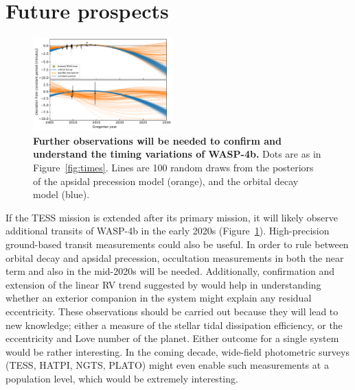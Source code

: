\documentclass[12pt,twocolumn,tighten]{aastex62}
\begin{document}
\section{Future prospects}
\label{sec:future}

\begin{figure}[!t]
	\begin{center}
		\leavevmode
		\includegraphics[width=0.48\textwidth]{f5.pdf}
	\end{center}
  \vspace{-0.5cm}
	\caption{
		{\bf Further observations will be needed to
	    confirm and understand the timing variations of WASP-4b.}
		Dots are as in Figure~\ref{fig:times}.
		Lines are 100 random draws from the posteriors of the apsidal
		precession model (orange), and the orbital decay model (blue).    
		\label{fig:future}
	}
\end{figure}

If the TESS mission is extended after its primary mission, it will
likely observe additional transits of WASP-4b in the early 2020s
(Figure~\ref{fig:future}).  High-precision ground-based transit
measurements could also be useful.  In order to rule between orbital
decay and apsidal precession, occultation measurements in both the
near term and also in the mid-2020s will be needed.  Additionally,
confirmation and extension of the linear RV trend suggested by
\citet{knutson_friends_2014} would help in understanding whether an
exterior companion in the system might explain any residual
eccentricity.  These observations should be carried out because they
will lead to new knowledge; either a measure of the stellar tidal
dissipation efficiency, or the eccentricity and Love number of the
planet.  Either outcome for a single system would be rather
interesting.  In the coming decade, wide-field photometric surveys
(TESS, HATPI, NGTS, PLATO) might even enable such measurements at a
population level, which would be extremely interesting.
\end{document}
